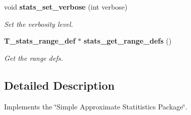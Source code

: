 \begin{CompactItemize}
void {\bf stats\_\-set\_\-verbose} (int verbose)
\begin{CompactList}\small\item\em Set the verbosity level.\item\end{CompactList}\item 
{\bf T\_\-stats\_\-range\_\-def} $\ast$ {\bf stats\_\-get\_\-range\_\-defs} ()
\begin{CompactList}\small\item\em Get the range defs.\item\end{CompactList}\end{CompactItemize}


\subsection{Detailed Description}
Implements the \char`\"{}Simple Approximate Statitistics Package\char`\"{}.



